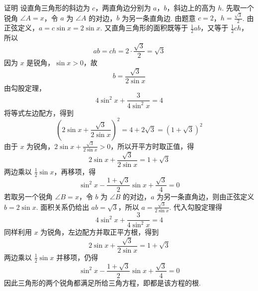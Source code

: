 \begin{solution}
证明 设直角三角形的斜边为 \(c\)，两直角边分别为 \(a\)，\(b\)，斜边上的高为 \(h\). 先取一个锐角 \(\angle A=x\)，令 \(a\) 为 \(\angle A\) 的对边，\(b\) 为另一条直角边. 由题意 \(c=2\)，\(h=\frac{\sqrt{3}}{2}\).
由正弦定义，\(a=c\sin x=2\sin x\). 又直角三角形的面积既等于 \(\frac{1}{2}ab\)，又等于 \(\frac{1}{2}ch\)，所以
\[
ab=ch=2\cdot\frac{\sqrt{3}}{2}=\sqrt{3}
\]
因为 \(x\) 是锐角，\(\sin x>0\)，故
\[
b=\frac{\sqrt{3}}{2\sin x}
\]
由勾股定理，
\[
4\sin^{2}x+\frac{3}{4\sin^{2}x}=4
\]
将等式左边配方，得到
\[
\left(2\sin x+\frac{\sqrt{3}}{2\sin x}\right)^{2}=4+2\sqrt{3}=\left(1+\sqrt{3}\right)^{2}
\]
由于 \(x\) 为锐角，\(2\sin x+\frac{\sqrt{3}}{2\sin x}>0\)，所以开平方时取正值，得
\[
2\sin x+\frac{\sqrt{3}}{2\sin x}=1+\sqrt{3}
\]
两边乘以 \(\frac{1}{2}\sin x\)，再移项，得
\[
\sin^{2}x-\frac{1+\sqrt{3}}{2}\sin x+\frac{\sqrt{3}}{4}=0
\]
若取另一个锐角 \(\angle B=x\)，令 \(b\) 为 \(\angle B\) 的对边，\(a\) 为另一条直角边，则由正弦定义 \(b=2\sin x\). 面积关系仍给出 \(ab=\sqrt{3}\)，所以 \(a=\frac{\sqrt{3}}{2\sin x}\). 代入勾股定理得
\[
4\sin^{2}x+\frac{3}{4\sin^{2}x}=4
\]
同样利用 \(x\) 为锐角，左边配方并取正平方根，得到
\[
2\sin x+\frac{\sqrt{3}}{2\sin x}=1+\sqrt{3}
\]
两边乘以 \(\frac{1}{2}\sin x\) 并移项，仍得
\[
\sin^{2}x-\frac{1+\sqrt{3}}{2}\sin x+\frac{\sqrt{3}}{4}=0
\]
因此三角形的两个锐角都满足所给三角方程，即都是该方程的根.
\end{solution}
